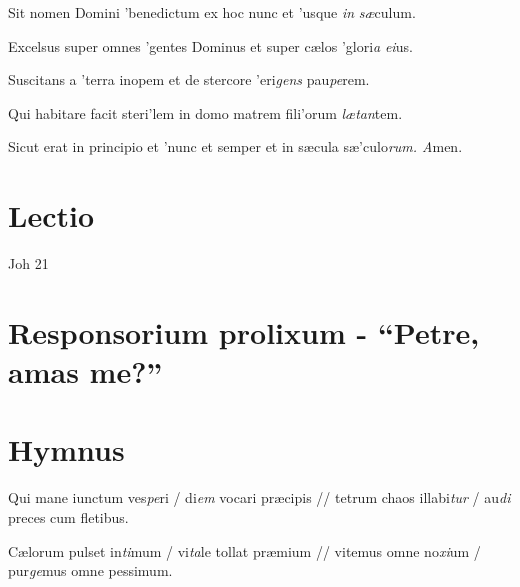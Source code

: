 \documentclass[initial=ZallmanCaps,staff=19,font=greciliae,11pt,a4paper,openany,twoside,choralsign=PfefferMediaeval]{gregorian}
\begin{document}
\par
{}
\par
\vskip9bp
\begin{multicols}{2}\setlength{\columnseprule}{0.2px}
Sit nomen Domini 'benedictum \grestar{} ex hoc nunc et 'usque \textit{in} \textit{sæ}culum.\par
{}\par
Excelsus super omnes 'gentes Dominus \grestar{} et super cælos 'glori\textit{a} \textit{ei}us.\par
{}\par
Suscitans a 'terra inopem \grestar{} et de stercore 'eri\textit{gens} pau\textit{pe}rem.\par
{}\par
Qui habitare facit steri'lem in domo \grestar{} matrem fili'orum \textit{lætan}tem.\par
{}\par
Sicut erat in principio et 'nunc et semper \grestar{} et in sæcula sæ'culo\textit{rum. A}men.\par
\end{multicols}
\section*{Lectio}
Joh 21\par
{}
\newpage
\section*{Responsorium prolixum - \enquote{Petre, amas me?}}
\section*{Hymnus}
\par
\vskip9mm
\begin{multicols}{2}\setlength{\columnseprule}{0.2px}
Qui mane iunctum ves\textit{pe}ri / di\textit{em} vocari præcipis // tetrum chaos illabi\textit{tur} / au\textit{di} preces cum fletibus.\par
{}\par
Cælorum pulset in\textit{ti}mum / vi\textit{ta}le tollat præmium // vitemus omne no\textit{xi}um / pur\textit{ge}mus omne pessimum.\par
{}\end{multicols}
\vskip9mm
\end{document}
